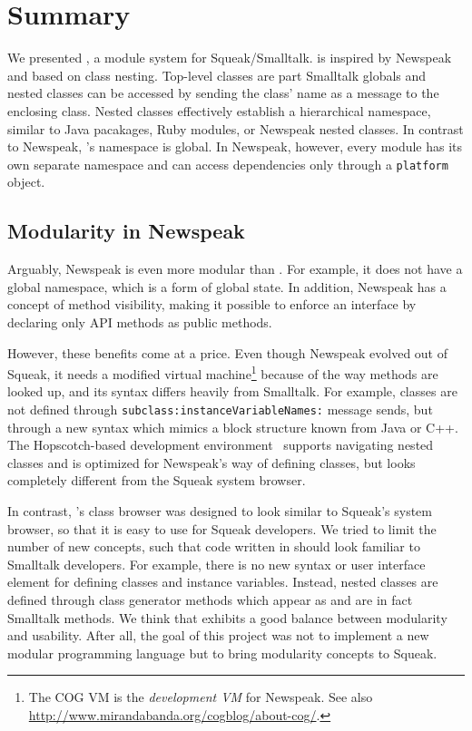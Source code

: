 \chapter{Summary}
\label{sec:summary}
We presented \msname, a module system for Squeak/Smalltalk. \msname is inspired by Newspeak and based on class nesting. Top-level classes are part Smalltalk globals and nested classes can be accessed by sending the class' name as a message to the enclosing class. Nested classes effectively establish a hierarchical namespace, similar to Java pacakages, Ruby modules, or Newspeak nested classes. In contrast to Newspeak, \msname's namespace is global. In Newspeak, however, every module has its own separate namespace and can access dependencies only through a \texttt{platform} object.

\section{Modularity in Newspeak}
Arguably, Newspeak is even more modular than \msname. For example, it does not have a global namespace, which is a form of global state. In addition, Newspeak has a concept of method visibility, making it possible to enforce an interface by declaring only API methods as public methods. 

However, these benefits come at a price. Even though Newspeak evolved out of Squeak, it needs a modified virtual machine\footnote{The COG VM is the \emph{development VM} for Newspeak. See also \url{http://www.mirandabanda.org/cogblog/about-cog/}.} because of the way methods are looked up, and its syntax differs heavily from Smalltalk. For example, classes are not defined through \texttt{subclass:instanceVariableNames:} message sends, but through a new syntax which mimics a block structure known from Java or C++. The Hopscotch-based development environment~\cite{Bykov08hopscotch:towards} supports navigating nested classes and is optimized for Newspeak's way of defining classes, but looks completely different from the Squeak system browser. 

In contrast, \msname's class browser was designed to look similar to Squeak's system browser, so that it is easy to use for Squeak developers. We tried to limit the number of new concepts, such that code written in \msname should look familiar to Smalltalk developers. For example, there is no new syntax or user interface element for defining classes and instance variables. Instead, nested classes are defined through class generator methods which appear as and are in fact Smalltalk methods. We think that \msname exhibits a good balance between modularity and usability. After all, the goal of this project was not to implement a new modular programming language but to bring modularity concepts to Squeak.

